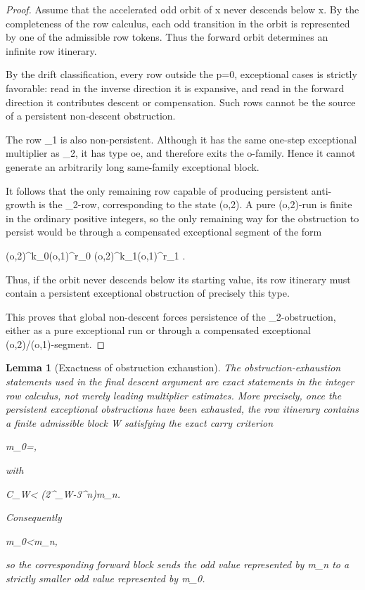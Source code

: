 \documentclass[11pt,letterpaper]{amsart}
\def\({}%
\def\){}%
\def\[{ }%
\def\]{ }%
\theoremstyle{definition}
\theoremstyle{plain}
\newtheorem{lemma}{Lemma}
\theoremstyle{plain}
\theoremstyle{remark}
\begin{document}
\begin{proof}
Assume that the accelerated odd orbit of \(x\) never descends below \(x\).
By the completeness of the row calculus, each odd transition in the orbit
is represented by one of the admissible row tokens.  Thus the forward
orbit determines an infinite row itinerary.

By the drift classification, every row outside the \(p=0\), \(\)
exceptional cases is strictly favorable: read in the inverse direction it
is expansive, and read in the forward direction it contributes descent or
compensation.  Such rows cannot be the source of a persistent
non-descent obstruction.

The row \(\omega_1\) is also non-persistent.  Although it has the same
one-step exceptional multiplier as \(\Omega_2\), it has type \(oe\), and
therefore exits the \(o\)-family.  Hence it cannot generate an
arbitrarily long same-family exceptional block.

It follows that the only remaining row capable of producing persistent
anti-growth is the \(\Omega_2\)-row, corresponding to the state
\((o,2)\).  A pure \((o,2)\)-run is finite in the ordinary positive
integers, so the only remaining way for the obstruction to persist would
be through a compensated exceptional segment of the form
\[
(o,2)^{k_0}(o,1)^{r_0}
(o,2)^{k_1}(o,1)^{r_1}
\cdots .
\]
Thus, if the orbit never descends below its starting value, its row
itinerary must contain a persistent exceptional obstruction of precisely
this type.

This proves that global non-descent forces persistence of the
\(\Omega_2\)-obstruction, either as a pure exceptional run or through a
compensated exceptional \((o,2)/(o,1)\)-segment.
\end{proof}




\begin{lemma}[Exactness of obstruction exhaustion]
\label{lem:exactness-obstruction-exhaustion}
The obstruction-exhaustion statements used in the final descent argument
are exact statements in the integer row calculus, not merely leading
multiplier estimates.  More precisely, once the persistent exceptional
obstructions have been exhausted, the row itinerary contains a finite
admissible block \(W\) satisfying the exact carry criterion
\[
m_0=,
\]
with
\[
C_W<
\left(2^{\Sigma_W}-3^n\right)m_n.
\]
Consequently
\[
m_0<m_n,
\]
so the corresponding forward block sends the odd value represented by
\(m_n\) to a strictly smaller odd value represented by \(m_0\).
\end{lemma}
\end{document}
